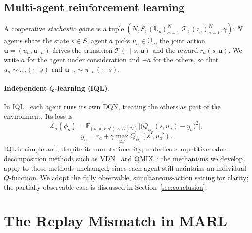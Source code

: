 \documentclass[sigconf]{aamas}
\newcommand{\uma}{\mathbf{u}_{-a}}
\newcommand{\Dcal}{\mathcal{D}}
\begin{document}
\subsection{Multi-agent reinforcement learning}
A cooperative \emph{stochastic game} is a tuple
$(N,S,(\mathbb{U}_a)_{a=1}^N,\mathcal{T},(r_a)_{a=1}^N,\gamma)$: $N$ agents share
the state $s\in S$, agent $a$ picks $u_a\in\mathbb{U}_a$, the joint action
$\mathbf{u}=(u_a,\uma)$ drives the transition
$\mathcal{T}(\cdot\mid s,\mathbf{u})$ and the reward $r_a(s,\mathbf{u})$. We
write $a$ for the agent under consideration and $-a$ for the others, so that
$u_a\sim\pi_a(\cdot\mid s)$ and $\uma\sim\pi_{-a}(\cdot\mid s)$.

\paragraph{Independent $Q$-learning (IQL).}
In IQL~\cite{tampuu2017multiagent} each agent runs its own DQN, treating the
others as part of the environment. Its loss is
\begin{equation}
\label{eq:iql}
\mathcal{L}_a(\phi_a)=\mathbb{E}_{(s,\mathbf{u},r,s')\sim U(\Dcal)}
\Big[\big(Q_{\phi_a}(s,u_a)-y_a\big)^2\Big],
\end{equation}
\[
y_a=r_a+\gamma\max_{u_a'}Q_{\bar\phi_a}(s',u_a').
\]
IQL is simple and, despite its non-stationarity, underlies competitive
value-decomposition methods such as VDN~\cite{sunehag2018value} and
QMIX~\cite{rashid2018qmix}; the mechanisms we develop apply to those methods
unchanged, since each agent still maintains an individual $Q$-function. We adopt
the fully observable, simultaneous-action setting for clarity; the partially
observable case is discussed in Section~\ref{sec:conclusion}.

\section{The Replay Mismatch in MARL}
\label{sec:formulation}
\end{document}
